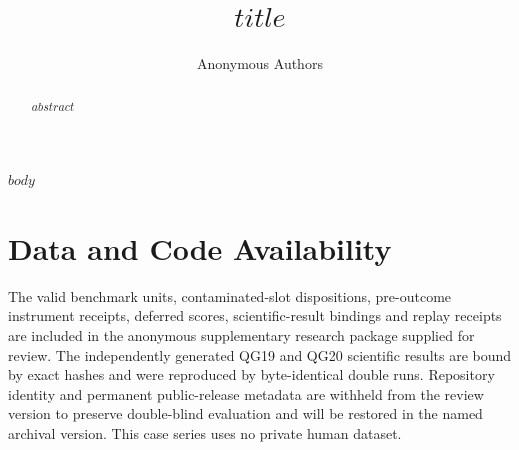 \documentclass[10pt]{article}
\title{$title$}
\author{Anonymous Authors}
\date{}
\begin{document}
\maketitle
\begingroup
\renewcommand\thefootnote{}
\addtocounter{footnote}{-1}
\endgroup

\begin{abstract}
$abstract$
\end{abstract}

$body$

\section*{Data and Code Availability}
The valid benchmark units, contaminated-slot dispositions, pre-outcome instrument receipts,
deferred scores, scientific-result bindings and replay receipts are included in the anonymous
supplementary research package supplied for review. The independently generated QG19 and QG20
scientific results are bound by exact hashes and were reproduced by byte-identical double runs.
Repository identity and permanent public-release metadata are withheld from the review version
to preserve double-blind evaluation and will be restored in the named archival version. This
case series uses no private human dataset.



\end{document}
